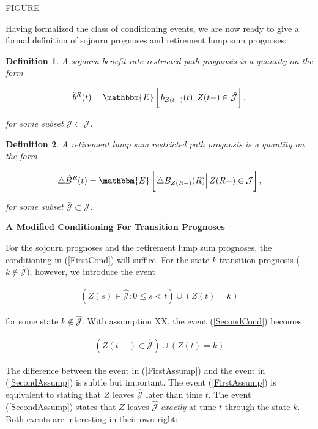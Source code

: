 \documentclass{article}
\newcommand{\1}[1]{\mathbbm{1}_{\left\lbrace #1 \right\rbrace}}
\newcommand{\econd}[2][def]{\mathbbm{E} \left[ \left. #1 \right| #2 \right]}
\theoremstyle{break}
\newtheorem{definition}{Definition}[section]
\theoremstyle{remark}
\numberwithin{equation}{section}
\begin{document}
FIGURE

Having formalized the class of conditioning events, we are now ready to give a formal definition of sojourn prognoses and retirement lump sum prognoses:

\begin{definition}
	A sojourn benefit rate restricted path prognosis is a quantity on the form
	
	\begin{gather*}
		\hat{b}^R(t) = \econd[b_{Z(t-)}(t)]{Z(t-) \in \hat{\mathcal{J}}},
	\end{gather*}
	
	for some subset $\bar{\mathcal{J}} \subset \mathcal{J}$.
\end{definition}

\begin{definition}
	A retirement lump sum restricted path prognosis is a quantity on the form
	
	\begin{gather*}
		\triangle \hat{B}^R(t) = \econd[\triangle B_{Z(R-)}(R)]{Z(R-) \in \bar{\mathcal{J}}},
	\end{gather*}
	
	for some subset $\bar{\mathcal{J}} \subset \mathcal{J}$.
\end{definition}

\textbf{A Modified Conditioning For Transition Prognoses}

For the sojourn prognoses and the retirement lump sum prognoses, the conditioning in (\ref{FirstCond}) will suffice. For the state $k$ transition prognosis ($k \notin \hat{\mathcal{J}}$), however, we introduce the event

\begin{align} \label{SecondCond}
	\left( Z(s) \in \hat{\mathcal{J}} : 0 \leq s < t\right) \cup \left(Z(t) = k \right)
\end{align}

for some state $k \notin \hat{\mathcal{J}}$. With assumption XX, the event (\ref{SecondCond}) becomes

\begin{align} \label{SecondAssump}
	\left( Z(t-) \in \hat{\mathcal{J}}\right) \cup \left(Z(t) = k \right)
\end{align}

The difference between the event in (\ref{FirstAssump}) and the event in (\ref{SecondAssump}) is subtle but important. The event (\ref{FirstAssump}) is equivalent to stating that $Z$ leaves $ \hat{\mathcal{J}}$ later than time $t$. The event (\ref{SecondAssump}) states that $Z$ leaves $\hat{\mathcal{J}}$ \textit{exactly} at time $t$ through the state $k$. Both events are interesting in their own right:
\end{document}
